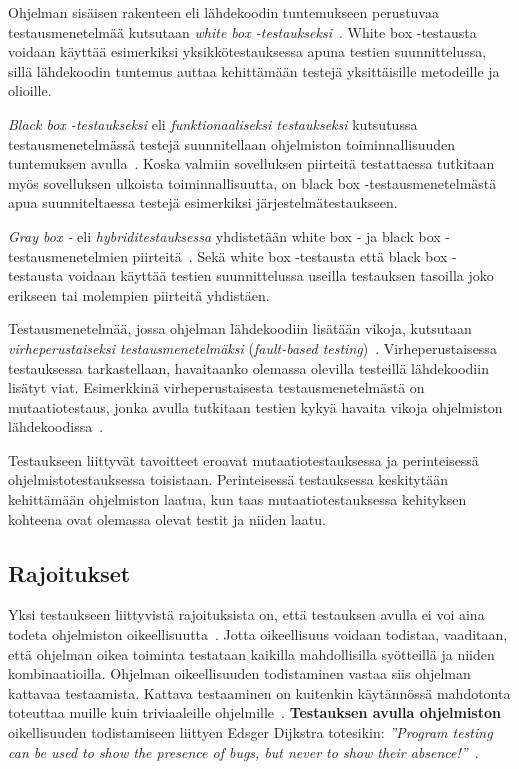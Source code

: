 \documentclass[finnish, grading]{tktltiki2}
\theoremstyle{definition}
\theoremstyle{remark}
\begin{document}
Ohjelman sisäisen rakenteen eli lähdekoodin tuntemukseen perustuvaa testausmenetelmää kutsutaan \textit{white box -testaukseksi}~\cite[s. 52]{Binder:1999}. White box -testausta voidaan käyttää esimerkiksi yksikkötestauksessa apuna testien suunnittelussa, sillä lähdekoodin tuntemus auttaa kehittämään testejä yksittäisille metodeille ja olioille.

\textit{Black box -testaukseksi} eli \textit{funktionaaliseksi testaukseksi} kutsutussa testausmenetelmässä testejä suunnitellaan ohjelmiston toiminnallisuuden tuntemuksen avulla~\cite[s. 51-52]{Binder:1999}. Koska valmiin sovelluksen piirteitä testattaessa tutkitaan myös sovelluksen ulkoista toiminnallisuutta, on black box -testausmenetelmästä apua suunniteltaessa testejä esimerkiksi järjestelmätestaukseen.

\textit{Gray box -} eli \textit{hybriditestauksessa} yhdistetään white box - ja black box -testausmenetelmien piirteitä~\cite[s. 52]{Binder:1999}. Sekä white box -testausta että black box -testausta voidaan käyttää testien suunnittelussa useilla testauksen tasoilla joko erikseen tai molempien piirteitä yhdistäen.

Testausmenetelmää, jossa ohjelman lähdekoodiin lisätään vikoja, kutsutaan \textit{virheperustaiseksi testausmenetelmäksi} (\textit{fault-based testing})~\cite[s. 52]{Binder:1999}. Virheperustaisessa testauksessa tarkastellaan, havaitaanko olemassa olevilla testeillä lähdekoodiin lisätyt viat. Esimerkkinä virheperustaisesta testausmenetelmästä on mutaatiotestaus, jonka avulla tutkitaan testien kykyä havaita vikoja ohjelmiston lähdekoodissa~\cite[s. 36]{DeMillo:Lipton:Sayward:1978}. 

Testaukseen liittyvät tavoitteet eroavat mutaatiotestauksessa ja perinteisessä ohjelmistotestauksessa toisistaan. Perinteisessä testauksessa keskitytään kehittämään ohjelmiston laatua, kun taas mutaatiotestauksessa kehityksen kohteena ovat olemassa olevat testit ja niiden laatu.

\subsection{Rajoitukset}

Yksi testaukseen liittyvistä rajoituksista on, että testauksen avulla ei voi aina todeta ohjelmiston oikeellisuutta~\cite[s. 58]{Binder:1999}. Jotta oikeellisuus voidaan todistaa, vaaditaan, että ohjelman oikea toiminta testataan kaikilla mahdollisilla syötteillä ja niiden kombinaatioilla. Ohjelman oikeellisuuden todistaminen vastaa siis ohjelman kattavaa testaamista. Kattava testaaminen on kuitenkin käytännössä mahdotonta toteuttaa muille kuin triviaaleille ohjelmille~\cite[s. 58]{Binder:1999}. \textbf{Testauksen avulla ohjelmiston} oikellisuuden todistamiseen liittyen Edsger Dijkstra totesikin: \textit{''Program testing can be used to show the presence of bugs, but never to show their absence!''}~\cite[s. 6]{Dahl:Dijkstra:Hoare:1972}.
\end{document}
